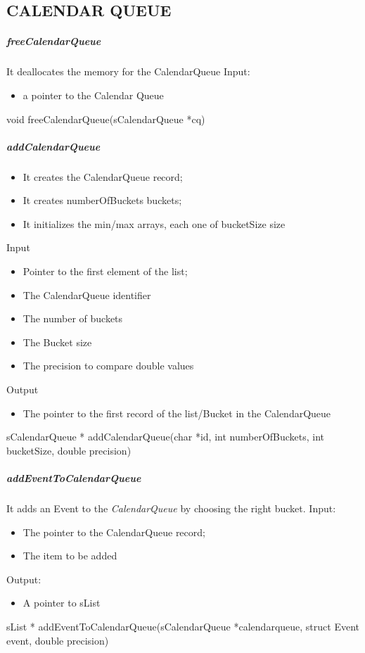 \subsection{CALENDAR QUEUE}
\subparagraph{freeCalendarQueue}

It deallocates the memory for the CalendarQueue
Input:
\begin{itemize}
\item a pointer to the Calendar Queue
\end{itemize}
void freeCalendarQueue(sCalendarQueue *cq)

\subparagraph{addCalendarQueue}

\begin{itemize}
\item It creates the CalendarQueue record;
\item It creates numberOfBuckets buckets;
\item It initializes the min/max arrays, each one of bucketSize size
\end{itemize}
Input
\begin{itemize}
\item Pointer to the first element of the list;
\item The CalendarQueue identifier
\item The number of buckets
\item The Bucket size
\item The precision to compare double values
\end{itemize}

Output
\begin{itemize}
\item The pointer to the first record of the list/Bucket in the CalendarQueue
\end{itemize}
sCalendarQueue * addCalendarQueue(char *id, int numberOfBuckets, int bucketSize, double precision)

\subparagraph{addEventToCalendarQueue}

It adds an Event to the \textit{CalendarQueue} by choosing the right bucket.
Input:
\begin{itemize}
\item The pointer to the CalendarQueue record;
\item The item to be added
\end{itemize}
Output:
\begin{itemize}
\item A pointer to sList
\end{itemize}
sList * addEventToCalendarQueue(sCalendarQueue *calendarqueue, struct Event event, double precision)

